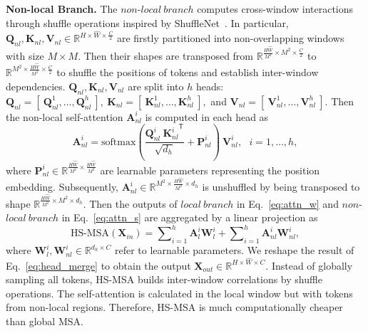 \documentclass{article}
\newcommand{\tsp}{^{\mathsf{T}}}
\begin{document}
\textbf{Non-local Branch.} The $non$-$local~branch$ computes cross-window interactions through shuffle operations inspired by ShuffleNet~\cite{shufflenet}. In particular,  $\mathbf{Q}_{nl},\mathbf{K}_{nl},\mathbf{V}_{nl}\in \mathbb{R}^{H\times \hat{W}\times \frac{C}{2}}$ are firstly  partitioned into non-overlapping windows with  size  $M\times M$. Then their shapes are transposed from $\mathbb{R}^{\frac{H\hat{W}}{M^2}\times M^2\times \frac{C}{2}}$ to $\mathbb{R}^{M^2\times \frac{H\hat{W}}{M^2} \times \frac{C}{2}}$ to shuffle the positions of tokens and establish inter-window dependencies. $\mathbf{Q}_{nl},\mathbf{K}_{nl},\mathbf{V}_{nl}$ are split into $h$ heads: $\mathbf{Q}_{nl} = [~\mathbf{Q}_{nl}^1, \ldots, \mathbf{Q}_{nl}^h~],~ \mathbf{K}_{nl} = [~\mathbf{K}_{nl}^1, \ldots, \mathbf{K}_{nl}^h~],$ and $\mathbf{V}_{nl} =  [~\mathbf{V}_{nl}^1, \ldots, \mathbf{V}_{nl}^h~]$. Then  the non-local self-attention $\mathbf{A}_{nl}^i$ is computed in each head as 
\begin{equation}
	\mathbf{A}_{nl}^i=\text{softmax}(\frac{\mathbf{Q}_{nl}^i~{\mathbf{K}_{nl}^i}\tsp}{\sqrt{d_h}} + \mathbf{P}_{nl}^i)~\mathbf{V}_{nl}^i, ~~~ i=1, \ldots, h,
	\label{eq:attn_s}
\end{equation}
where $\mathbf{P}_{nl}^i \in \mathbb{R}^{\frac{H\hat{W}}{M^2} \times \frac{H\hat{W}}{M^2}}$ are learnable parameters representing the position embedding. Subsequently, $\mathbf{A}_{nl}^i \in \mathbb{R}^{M^2\times \frac{H\hat{W}}{M^2} \times d_h}$ is  unshuffled by being transposed to shape $\mathbb{R}^{\frac{H\hat{W}}{M^2}\times M^2 \times d_h}$. Then the outputs of $local~branch$ in Eq.~\eqref{eq:attn_w} and $non$-$local~branch$ in Eq.~\eqref{eq:attn_s} are aggregated by a linear projection as
\begin{equation}
	\text{HS-MSA}(\mathbf{X}_{in})=\sum\nolimits_{i=1}^{h} \mathbf{A}_{l}^i \mathbf{W}_{l}^i+
	\sum\nolimits_{i=1}^{h} \mathbf{A}_{nl}^i \mathbf{W}_{nl}^i,
	\label{eq:head_merge}
\end{equation}
where $\mathbf{W}_{l}^i,\mathbf{W}_{nl}^i \in \mathbb{R}^{d_h\times C}$ refer to learnable parameters. We reshape the result of Eq.~\eqref{eq:head_merge} to obtain the output  $\mathbf{X}_{out}\in\mathbb{R}^{H\times \hat{W}  \times C}$. 
Instead of globally sampling all tokens, HS-MSA builds inter-window correlations by shuffle operations. The self-attention is calculated in the local window but with tokens from non-local regions. Therefore, HS-MSA is much computationally cheaper than global MSA. 
\end{document}
